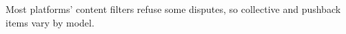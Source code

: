 Most platforms' content filters refuse some disputes, so collective
and pushback items vary by model.
